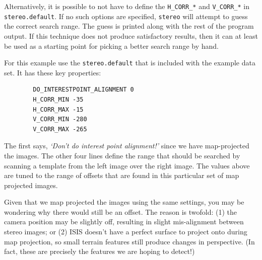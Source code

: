 Alternatively, it is possible to not have to define the
\texttt{H\_CORR\_*} and \texttt{V\_CORR\_*} in
\texttt{stereo.default}. If no such options are specified,
\texttt{stereo} will attempt to guess the correct search range. The
guess is printed along with the rest of the program output.  If this
technique does not produce satisfactory results, then it can at least
be used as a starting point for picking a better search range by hand.

For this example use the \texttt{stereo.default} that is included with
the example data set. It has these key properties:

\begin{verbatim}
        DO_INTERESTPOINT_ALIGNMENT 0
        H_CORR_MIN -35
        H_CORR_MAX -15
        V_CORR_MIN -280
        V_CORR_MAX -265
\end{verbatim}

The first says, \emph{`Don't do interest point alignment!'} since we
have map-projected the images. The other four lines define the range
that should be searched by scanning a template from the left image
over the right image. The values above are tuned to the range of
offsets that are found in this particular set of map projected images.

Given that we map projected the images using the same settings, you
may be wondering why there would still be an offset. The reason is
twofold: (1) the camera position may be slightly off, resulting in
slight mis-alignment between stereo images; or (2) \ac{ISIS} doesn't
have a perfect surface to project onto during map projection, so small
terrain features still produce changes in perspective.  (In fact,
these are precisely the features we are hoping to detect!)

\begin{center}
\end{center}

